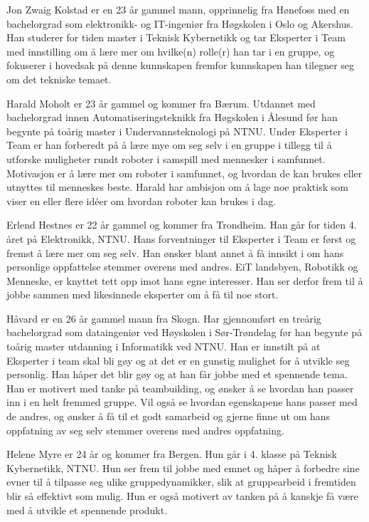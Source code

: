 Jon Zwaig Kolstad er en 23 år gammel mann, opprinnelig fra Hønefoss med en bachelorgrad som elektronikk- og IT-ingeniør fra Høgskolen i Oslo og Akershus. Han studerer for tiden master i Teknisk Kybernetikk og tar Eksperter i Team med innstilling om å lære mer om hvilke(n) rolle(r) han tar i en gruppe, og fokuserer i hovedsak på denne kunnskapen fremfor kunnskapen han tilegner seg om det tekniske temaet. 

Harald Moholt er 23 år gammel og kommer fra Bærum. Utdannet med bachelorgrad innen Automatiseringsteknikk fra Høgskolen i Ålesund før han begynte på toårig master i Undervannsteknologi på NTNU. Under Eksperter i Team er han forberedt på å lære mye om seg selv i en gruppe i tillegg til å utforske muligheter rundt roboter i samspill med mennesker i samfunnet. Motivasjon er å lære mer om roboter i samfunnet, og hvordan de kan brukes eller utnyttes til menneskes beste. Harald har ambisjon om å lage noe praktisk som viser en eller flere idéer om hvordan roboter kan brukes i dag.

Erlend Hestnes er 22 år gammel og kommer fra Trondheim. Han går for tiden 4. året på Elektronikk, NTNU. Hans forventninger til Eksperter i Team er først og fremst å lære mer om seg selv. Han ønsker blant annet å få innsikt i om hans personlige oppfattelse stemmer overens med andres. EiT landsbyen, Robotikk og Menneske, er knyttet tett opp imot hans egne interesser. Han ser derfor frem til å jobbe sammen med likesinnede eksperter om å få til noe stort. 

Håvard er en 26 år gammel mann fra Skogn. Har gjennomført en treårig bachelorgrad som dataingeniør ved Høyskolen i Sør-Trønde\-lag før han begynte på toårig master utdanning i Informatikk ved NTNU. Han er innstilt på at Eksperter i team skal bli gøy og at det er en gunstig mulighet for å utvikle seg personlig. Han håper det blir gøy og at han får jobbe med et spennende tema. Han er motivert med tanke på teambuilding, og ønsker å se hvordan han passer inn i en helt fremmed gruppe. Vil også se hvordan egenskapene hans passer med de andres, og ønsker å få til et godt samarbeid og gjerne finne ut om hans oppfatning av seg selv stemmer overens med andres oppfatning.

Helene Myre er 24 år og kommer fra Bergen. Hun går i 4. klasse på Teknisk Kybernetikk, NTNU. Hun ser frem til jobbe med emnet og håper å forbedre sine evner til å tilpasse seg ulike gruppedynamikker, slik at gruppearbeid i fremtiden blir så effektivt som mulig. Hun er også motivert av tanken på å kanskje få være med å utvikle et spennende produkt.


